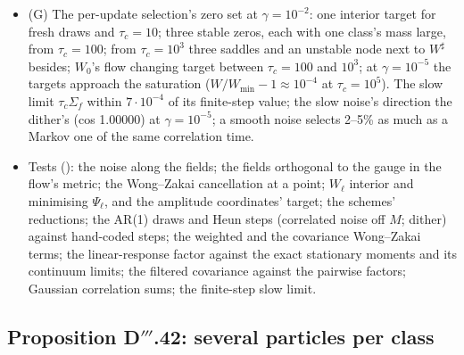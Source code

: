 \begin{itemize}
    products' decay rates over the prediction 0.9988--0.9998 on average, the prediction differing across coordinates by a
    factor up to 2.17 at $\rho = 0.999$. (F) A tanh network: the sharpness's slope over the prediction 0.990--1.060 to
    $\rho = 0.9$ (slower noise below the measurement's floor).
  \item (G) The per-update selection's zero set at $\gamma = 10^{-2}$: one interior target for fresh draws and
    $\tau_c = 10$; three stable zeros, each with one class's mass large, from $\tau_c = 100$; from $\tau_c = 10^3$ three
    saddles and an unstable node next to $W^\sharp$ besides; $W_0$'s flow changing target between $\tau_c = 100$ and
    $10^3$; at $\gamma = 10^{-5}$ the targets approach the saturation ($W/W_{\min} - 1\approx10^{-4}$ at
    $\tau_c = 10^5$). The slow limit $\tau_c\Sigma_f$ within $7\cdot10^{-4}$ of its finite-step value; the slow noise's
    direction the dither's (cos 1.00000) at $\gamma = 10^{-5}$; a smooth noise selects 2--5\% as much as a Markov one of
    the same correlation time.
  \item Tests (): the noise along the fields; the fields orthogonal to the gauge in the
    flow's metric; the Wong--Zakai cancellation at a point; $W_\ell$ interior and minimising $\Psi_\ell$, and the
    amplitude coordinates' target; the schemes' reductions; the AR(1) draws and Heun steps (correlated noise off $M$;
    dither) against hand-coded steps; the weighted and the covariance Wong--Zakai terms; the linear-response factor
    against the exact stationary moments and its continuum limits; the filtered covariance against the pairwise factors;
    Gaussian correlation sums; the finite-step slow limit.
\end{itemize}

\subsection{Proposition D\texorpdfstring{$'''$}{'''}.42: several particles per class}

